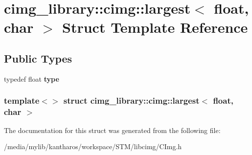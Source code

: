 \hypertarget{structcimg__library_1_1cimg_1_1largest_3_01float_00_01char_01_4}{
\section{cimg\_\-library::cimg::largest$<$ float, char $>$ Struct Template Reference}
\label{structcimg__library_1_1cimg_1_1largest_3_01float_00_01char_01_4}
}
\subsection*{Public Types}
\begin{DoxyCompactItemize}
\item 
\hypertarget{structcimg__library_1_1cimg_1_1largest_3_01float_00_01char_01_4_a7a0e683a216b71d9d0f7a55d54ac34a7}{
typedef float {\bfseries type}}
\label{structcimg__library_1_1cimg_1_1largest_3_01float_00_01char_01_4_a7a0e683a216b71d9d0f7a55d54ac34a7}

\end{DoxyCompactItemize}
\subsubsection*{template$<$$>$ struct cimg\_\-library::cimg::largest$<$ float, char $>$}



The documentation for this struct was generated from the following file:\begin{DoxyCompactItemize}
\item 
/media/mylib/kantharos/workspace/STM/libcimg/CImg.h\end{DoxyCompactItemize}
